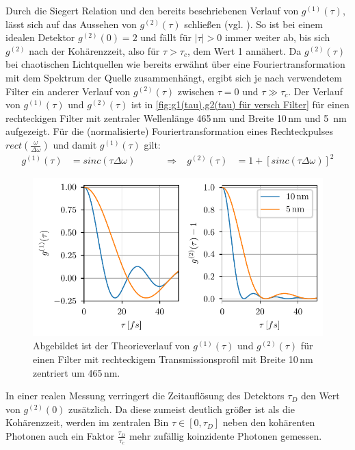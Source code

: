 Durch die Siegert Relation und den bereits beschriebenen Verlauf von $g^{(1)}(\tau)$, lässt sich auf das Aussehen von $g^{(2)}(\tau)$ schließen (vgl. \cite[Kap. 6.3]{foxQuantumOpticsIntroduction2006}). 
So ist bei einem idealen Detektor $g^{(2)}(0)=2$ und fällt für $|\tau|>0$ immer weiter ab, bis sich $g^{(2)}$ nach der Kohärenzzeit, also für $\tau>\tau_c$, dem Wert 1 annähert. 
Da $g^{(2)}(\tau)$ bei chaotischen Lichtquellen wie bereits erwähnt über eine Fouriertransformation mit dem Spektrum der Quelle zusammenhängt, ergibt sich je nach verwendetem Filter ein anderer Verlauf von $g^{(2)}(\tau)$ zwischen $\tau=0$ und $\tau \gg \tau_c$. 
Der Verlauf von $g^{(1)}(\tau)$ und $g^{(2)}(\tau)$ ist in \autoref{fig:g1(tau),g2(tau) für versch Filter} für einen rechteckigen Filter mit zentraler Wellenlänge 465\,nm und Breite 10\,nm und 5 \,nm aufgezeigt. 
Für die (normalisierte) Fouriertransformation eines Rechteckpulses $rect\left(\frac{\omega}{\Delta\omega}\right)$ und damit $g^{(1)}(\tau)$ gilt:
\begin{align}
    g^{(1)}(\tau) &= sinc\left(\tau\Delta\omega\right) \quad\quad\quad \Rightarrow& g^{(2)}(\tau) &= 1+ \left[sinc\left(\tau\Delta\omega\right)\right]^2
\end{align}
\begin{figure}[htbp]
    \centering
    \includegraphics{images/Theorie/g1_g2_tau.pdf}
    \caption{Abgebildet ist der Theorieverlauf von $g^{(1)}(\tau)$ und $g^{(2)}(\tau)$ für einen Filter mit rechteckigem Transmissionsprofil mit Breite 10\,nm zentriert um 465\,nm.}
    \label{fig:g1(tau),g2(tau) für versch Filter}
\end{figure}
In einer realen Messung verringert die Zeitauflösung des Detektors $\tau_D$ den Wert von $g^{(2)}(0)$ zusätzlich. 
Da diese zumeist deutlich größer ist als die Kohärenzzeit, werden im zentralen Bin $\tau \in [0, \tau_D]$ neben den kohärenten Photonen auch ein Faktor $\frac{\tau_D}{\tau_c}$ mehr zufällig koinzidente Photonen gemessen. 
